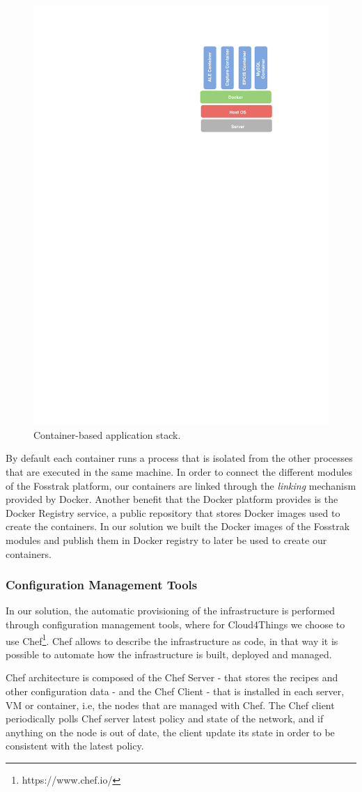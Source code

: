 \begin{figure}[!h]
  \centering
  \includegraphics[width=.45\textwidth]{images/docker-stack}
  \caption{Container-based application stack.}
  \label{fig:docker_stack}
\end{figure}

By default each container runs a process that is isolated from the other processes that are executed in
the same machine. In order to connect the different modules of the Fosstrak platform, our containers are
linked through the \textit{linking} mechanism provided by Docker. Another benefit that the Docker platform
provides is the Docker Registry service, a public repository that stores Docker images used to create the
containers. In our solution we built the Docker images of the Fosstrak modules and publish them
in Docker registry to later be used to create our containers.
\subsubsection{Configuration Management Tools}
\label{subs:cm_tools}
In our solution, the automatic provisioning of the infrastructure is performed through configuration
management tools, where for Cloud4Things we choose to use Chef\footnote{https://www.chef.io/}. Chef
allows to describe the infrastructure as code, in that way it is possible to automate how the
infrastructure is built, deployed and managed.

Chef architecture is composed of the Chef Server - that stores the recipes and other configuration data -
and the  Chef Client - that is installed in each server, VM or container, i.e, the nodes that are managed with Chef.
The Chef client periodically polls Chef server latest policy and state of the network, and if anything on the
node is out of date, the client update its state in order to be consistent with the latest policy.

